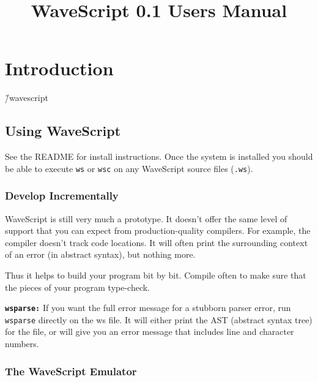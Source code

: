 


\title{WaveScript 0.1 Users Manual}



\maketitle


\tableofcontents
\clearpage

\chapter{Introduction}

\~/wavescript

\section{Using WaveScript}

See the README for install instructions.  Once the system is installed
you should be able to execute {\tt ws} or {\tt wsc} on any WaveScript
source files ({\tt .ws}).

\subsection*{Develop Incrementally}

WaveScript is still very much a prototype.  It doesn't offer the same
level of support that you can expect from production-quality
compilers.  For example, the compiler doesn't track code locations.
It will often print the surrounding context of an error (in abstract
syntax), but nothing more.

Thus it helps to build your program bit by bit.  Compile often to make
sure that the pieces of your program type-check.

{\tt \bf wsparse:}
If you want the full error message for a stubborn parser error, run
{\tt wsparse} directly on the ws file.  It will either print the AST
(abstract syntax tree) for the file, or will give you an error message
that includes line and character numbers.

\subsection*{The WaveScript Emulator}

